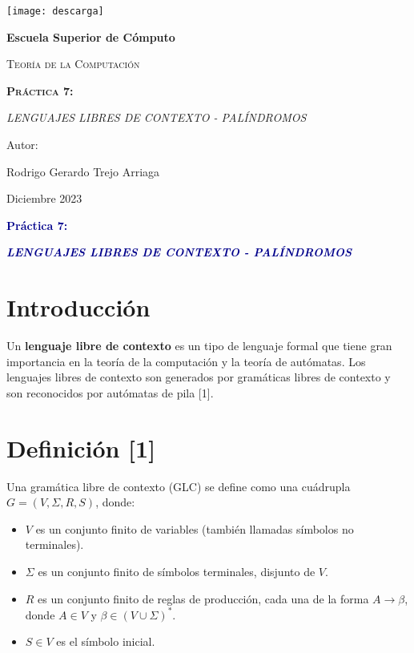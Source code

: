 \documentclass[11pt]{article} %
\begin{document}
	
	\begin{titlepage}
		\centering
		{\texttt{[image: descarga]}\par}
		\vspace{0.5cm}
		{\bfseries\huge Escuela Superior de Cómputo \par}
		\vspace{0.7cm}
		{\scshape\LARGE Teoría de la Computación \par}
		\vspace{0.3cm}
		\vspace{3.1cm}
		{\scshape \Huge \textbf{Práctica 7:}  \par}
		\vspace{0.03cm}
		{{\LARGE \textit{LENGUAJES LIBRES DE CONTEXTO - PALÍNDROMOS}} \par}
		\vspace{3.5cm}
		{\Large Autor: \par}
		{\Large Rodrigo Gerardo Trejo Arriaga \par}
		\vspace{3cm}
		{\Large Diciembre 2023 \par}
	\end{titlepage}
	
	\begin{center}
		\vspace*{0.1cm}
		{\huge \textcolor{darkBlue}{\textbf{Práctica 7:}} \par}
		
		{\Large \textcolor{darkBlue}{\textbf{\textit{LENGUAJES LIBRES DE CONTEXTO - PALÍNDROMOS}}}}
	\end{center}
	
	
	\section{Introducción}
	Un \textbf{lenguaje libre de contexto} es un tipo de lenguaje formal que tiene gran importancia en la teoría de la computación y la teoría de autómatas. Los lenguajes libres de contexto son generados por gramáticas libres de contexto y son reconocidos por autómatas de pila [1].
	
	\section{Definición [1]}
	Una gramática libre de contexto (GLC) se define como una cuádrupla \(G = (V, \Sigma, R, S)\), donde:
	\begin{itemize}
		\item \(V\) es un conjunto finito de variables (también llamadas símbolos no terminales).
		\item \(\Sigma\) es un conjunto finito de símbolos terminales, disjunto de \(V\).
		\item \(R\) es un conjunto finito de reglas de producción, cada una de la forma \(A \rightarrow \beta\), donde \(A \in V\) y \(\beta \in (V \cup \Sigma)^*\).
		\item \(S \in V\) es el símbolo inicial.
	\end{itemize}
	
\end{document}
